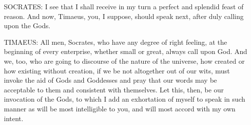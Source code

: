 SOCRATES: I see that I shall receive in my turn a perfect and splendid
feast of reason. And now, Timaeus, you, I suppose, should speak next,
after duly calling upon the Gods.

TIMAEUS: All men, Socrates, who have any degree of right feeling, at the
beginning of every enterprise, whether small or great, always call upon
God. And we, too, who are going to discourse of the nature of the
universe, how created or how existing without creation, if we be not
altogether out of our wits, must invoke the aid of Gods and Goddesses and
pray that our words may be acceptable to them and consistent with
themselves. Let this, then, be our invocation of the Gods, to which I add
an exhortation of myself to speak in such manner as will be most
intelligible to you, and will most accord with my own intent.


